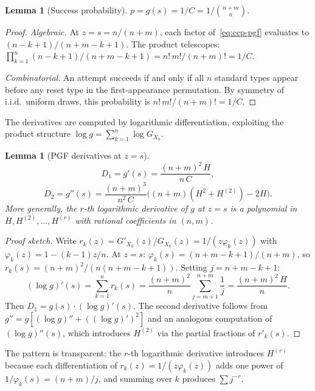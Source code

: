 \documentclass[11pt]{article}
\theoremstyle{plain}
\newtheorem{lemma}[theorem]{Lemma}
\theoremstyle{definition}
\theoremstyle{remark}
\begin{document}
\begin{lemma}[Success probability]\label{lem:ccp-p}
$p = g(s) = 1/C = 1/\binom{n+m}{n}$.
\end{lemma}

\begin{proof}
\emph{Algebraic.}\; At $z = s = n/(n+m)$, each factor of~\eqref{eq:ccp-pgf} evaluates to $(n{-}k{+}1)/(n{+}m{-}k{+}1)$.  The product telescopes: $\prod_{k=1}^n (n{-}k{+}1)/(n{+}m{-}k{+}1) = n!\,m!/(n{+}m)! = 1/C$.

\emph{Combinatorial.}\; An attempt succeeds if and only if all $n$ standard types appear before any reset type in the first-appearance permutation.  By symmetry of i.i.d.\ uniform draws, this probability is $n!\,m!/(n+m)! = 1/C$.
\end{proof}

The derivatives are computed by logarithmic differentiation, exploiting the product structure $\log g = \sum_{k=1}^n \log G_{X_k}$.

\begin{lemma}[PGF derivatives at $z = s$]\label{lem:ccp-derivs}
\begin{equation}\label{eq:ccp-D1}
  D_1 = g'(s) = \frac{(n+m)^2\,H}{n\,C},
\end{equation}
\begin{equation}\label{eq:ccp-D2}
  D_2 = g''(s) = \frac{(n+m)^3}{n^2\,C}\bigl((n+m)(H^2 + H^{(2)}) - 2H\bigr).
\end{equation}
More generally, the $r$-th logarithmic derivative of $g$ at $z = s$ is a polynomial in $H, H^{(2)}, \ldots, H^{(r)}$ with rational coefficients in $(n, m)$.
\end{lemma}

\begin{proof}[Proof sketch]
Write $r_k(z) = G'_{X_k}(z)/G_{X_k}(z) = 1/(z\varphi_k(z))$ with $\varphi_k(z) = 1-(k{-}1)z/n$.  At $z = s$: $\varphi_k(s) = (n{+}m{-}k{+}1)/(n{+}m)$, so $r_k(s) = (n{+}m)^2/(n(n{+}m{-}k{+}1))$.  Setting $j = n{+}m{-}k{+}1$:
\[
  (\log g)'(s) = \sum_{k=1}^n r_k(s) = \frac{(n+m)^2}{n}\sum_{j=m+1}^{n+m}\frac{1}{j} = \frac{(n+m)^2\,H}{n}.
\]
Then $D_1 = g(s)\cdot(\log g)'(s)$.  The second derivative follows from $g'' = g[(\log g)'' + ((\log g)')^2]$ and an analogous computation of $(\log g)''(s)$, which introduces $H^{(2)}$ via the partial fractions of $r'_k(s)$.
\end{proof}

The pattern is transparent: the $r$-th logarithmic derivative introduces $H^{(r)}$ because each differentiation of $r_k(z) = 1/(z\varphi_k(z))$ adds one power of $1/\varphi_k(s) = (n{+}m)/j$, and summing over $k$ produces $\sum j^{-r}$.
\end{document}
